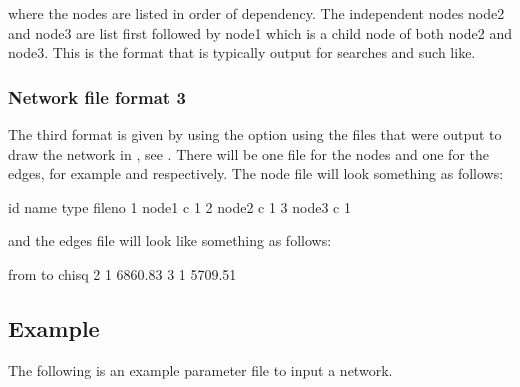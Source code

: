 \documentclass[letterpaper,10pt,english]{sphinxmanual}
\begin{document}
\begin{sphinxVerbatim}
\end{sphinxVerbatim}

\sphinxAtStartPar
where the nodes are listed in order of dependency. The independent nodes node2 and node3 are list first followed by node1 which is a child node of both node2 and node3.
This is the format that is typically output for searches and such like.


\subsubsection{Network file format 3}
\label{\detokenize{input-network:network-file-format-3}}\label{\detokenize{input-network:input-network-formats-format3}}
\sphinxAtStartPar
The third format is given by using the  option using the files that were output to draw the network in , see .
There will be one file for the nodes and one for the edges, for example  and  respectively. The node file will look something as follows:

\begin{sphinxVerbatim}[commandchars=\\\{\}]
id name type fileno
1 node1 c 1
2 node2 c 1
3 node3 c 1
\end{sphinxVerbatim}

\sphinxAtStartPar
and the edges file will look like something as follows:

\begin{sphinxVerbatim}[commandchars=\\\{\}]
from to chisq
2 1 6860.83
3 1 5709.51
\end{sphinxVerbatim}


\subsection{Example}
\label{\detokenize{input-network:example}}\label{\detokenize{input-network:input-network-example}}
\sphinxAtStartPar
The following is an example parameter file to input a network.
\end{document}

